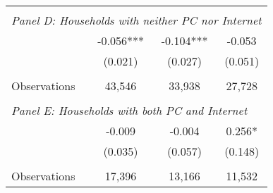 {\begin{tabular}{lccc}
&  &  &   \\
\multicolumn{4}{l}{\textit{Panel D: Households with neither PC nor Internet}} \\
\hspace{3mm}        &      -0.056***&      -0.104***&      -0.053   \\
                    &     (0.021)   &     (0.027)   &     (0.051)   \\
                    &               &               &               \\
\hspace{3mm}Observations&      43,546   &      33,938   &      27,728   \\
 
&  &  &   \\
\multicolumn{4}{l}{\textit{Panel E: Households with both PC and Internet}} \\
\hspace{3mm}        &      -0.009   &      -0.004   &       0.256*  \\
                    &     (0.035)   &     (0.057)   &     (0.148)   \\
                    &               &               &               \\
\hspace{3mm}Observations&      17,396   &      13,166   &      11,532   \\
 

\bottomrule
\end{tabular}
}
